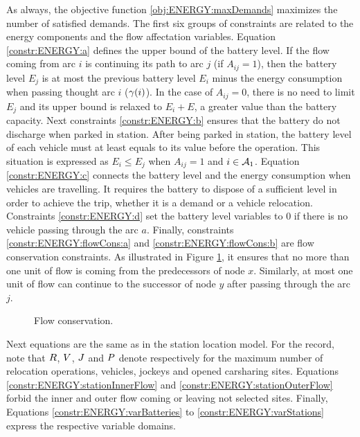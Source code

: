 \begin{bibunit}[ieeetr]
\bigskip
As always, the objective function \eqref{obj:ENERGY:maxDemands} maximizes the number of satisfied demands.
The first six groups of constraints are related to the energy components and the flow affectation variables.
Equation \eqref{constr:ENERGY:a} defines the upper bound of the battery level.
If the flow coming from arc $i$ is continuing its path to arc $j$ (\ie if $A_{ij} = 1$), then the battery level $E_j$ is at most the previous battery level $E_i$ minus the energy consumption when passing thought arc $i$ (\ie $\gamma(i)$).
In the case of $A_{ij} = 0$, there is no need to limit $E_j$ and its upper bound is relaxed to $E_i + E$, a greater value than the battery capacity.
%
Next constraints \eqref{constr:ENERGY:b} ensures that the battery do not discharge when parked in station.
After being parked in station, the battery level of each vehicle must at least equals to its value before the operation.
This situation is expressed as $E_i \leq E_j$ when $A_{ij} = 1$ and $i \in \mathcal{A}_1$.
%
Equation \eqref{constr:ENERGY:c} connects the battery level and the energy consumption when vehicles are travelling.
It requires the battery to dispose of a sufficient level in order to achieve the trip, whether it is a demand or a vehicle relocation.
%
Constraints \eqref{constr:ENERGY:d} set the battery level variables to $0$ if there is no vehicle passing through the arc $a$.
%
Finally, constraints \eqref{constr:ENERGY:flowCons:a} and \eqref{constr:ENERGY:flowCons:b} are flow conservation constraints.
As illustrated in Figure \ref{fig:flowConservation}, it ensures that no more than one unit of flow is coming from the predecessors of node $x$.
Similarly, at most one unit of flow can continue to the successor of node $y$ after passing through the arc $j$.

\begin{figure}[t]
\begin{center}
\scalebox{1}{}
\end{center}
\caption{Flow conservation.}
\label{fig:flowConservation}
\end{figure}

\medskip
Next equations are the same as in the station location model.
For the record, note that $R$, $V$, $J$ and $P$ denote respectively for the maximum number of relocation operations, vehicles, jockeys and opened carsharing sites.
Equations \eqref{constr:ENERGY:stationInnerFlow} and \eqref{constr:ENERGY:stationOuterFlow} forbid the inner and outer flow coming or leaving not selected sites.
%
Finally, Equations \eqref{constr:ENERGY:varBatteries} to \eqref{constr:ENERGY:varStations} express the respective variable domains.


\end{bibunit}
